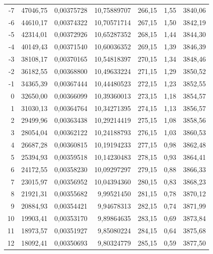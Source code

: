 \documentclass[12pt,a4paper,final,twoside,fleqn]{article}
\begin{document}
\begin{ThreePartTable}
\begin{longtable}{rrrrrrr}
-7           & 47046,75  & 0,00375728    & 10,75889707 & 266,15     & 1,55       & 3840,06 \\
-6           & 44610,17  & 0,00374322    & 10,70571714 & 267,15     & 1,50       & 3842,19 \\
-5           & 42314,01  & 0,00372926    & 10,65287352 & 268,15     & 1,44       & 3844,30 \\
-4           & 40149,43  & 0,00371540    & 10,60036352 & 269,15     & 1,39       & 3846,39 \\
-3           & 38108,17  & 0,00370165    & 10,54818397 & 270,15     & 1,34       & 3848,46 \\
-2           & 36182,55  & 0,00368800    & 10,49633224 & 271,15     & 1,29       & 3850,52 \\
-1           & 34365,39  & 0,00367444    & 10,44480523 & 272,15     & 1,23       & 3852,55 \\
0            & 32650,00  & 0,00366099    & 10,39360013 & 273,15     & 1,18       & 3854,57 \\
1            & 31030,13  & 0,00364764    & 10,34271395 & 274,15     & 1,13       & 3856,57 \\
2            & 29499,96  & 0,00363438    & 10,29214419 & 275,15     & 1,08       & 3858,56 \\
3            & 28054,04  & 0,00362122    & 10,24188793 & 276,15     & 1,03       & 3860,53 \\
4            & 26687,28  & 0,00360815    & 10,19194233 & 277,15     & 0,98       & 3862,48 \\
5            & 25394,93  & 0,00359518    & 10,14230483 & 278,15     & 0,93       & 3864,41 \\
6            & 24172,55  & 0,00358230    & 10,09297297 & 279,15     & 0,88       & 3866,33 \\
7            & 23015,97  & 0,00356952    & 10,04394360 & 280,15     & 0,83       & 3868,23 \\
8            & 21921,31  & 0,00355682    & 9,99521450  & 281,15     & 0,78       & 3870,12 \\
9            & 20884,93  & 0,00354421    & 9,94678313  & 282,15     & 0,74       & 3871,99 \\
10           & 19903,41  & 0,00353170    & 9,89864635  & 283,15     & 0,69       & 3873,84 \\
11           & 18973,57  & 0,00351927    & 9,85080224  & 284,15     & 0,64       & 3875,68 \\
12           & 18092,41  & 0,00350693    & 9,80324779  & 285,15     & 0,59       & 3877,50 \\

\end{longtable}
\end{ThreePartTable}
\end{document}
